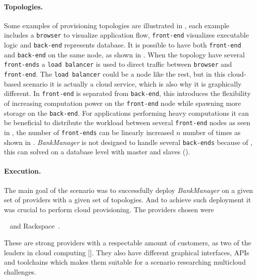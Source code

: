 \paragraph{Topologies.}



Some examples of provisioning topologies are illustrated in ,
each example includes a \texttt{browser} to visualize application flow,
\texttt{front-end} visualizes executable logic and \texttt{back-end} represents database.
It is possible to have both \texttt{front-end} and \texttt{back-end} on the same node, 
as shown in .
When the topology have several \texttt{front-ends} a \texttt{load balancer} is used
to direct traffic between \texttt{browser} and \texttt{front-end}.
The \texttt{load balancer} could be a node like the rest, but in this cloud-based scenario
it is actually a cloud service, which is also why it is graphically different.
In  \texttt{front-end} is separated from \texttt{back-end},
this introduces the flexibility of increasing computation power on the \texttt{front-end} node while spawning more
storage on the \texttt{back-end}.
For applications performing heavy computations it can be beneficial to distribute the workload between several
\texttt{front-end} nodes as seen in , the number of \texttt{front-ends} can be linearly increased
$n$ number of times as shown in .
\emph{BankManager} is not designed to handle several \texttt{back-ends} because of ,
this can solved on a database level with master and slaves ().

\paragraph{Execution.}

The main goal of the scenario was to successfully deploy \emph{BankManager}
on a given set of providers with a given set of topologies.
And to achieve such deployment it was crucial to perform cloud provisioning.
The providers chosen were 
\begin{ii}
  \iitem {}~\cite{aws} and
  \iitem Rackspace~\cite{rackspace}.
\end{ii}
These are strong providers with a respectable amount of customers, as two of the leaders in cloud computing
[].
They also have different graphical interfaces, APIs and toolchains which makes them suitable
for a scenario researching multicloud challenges.

